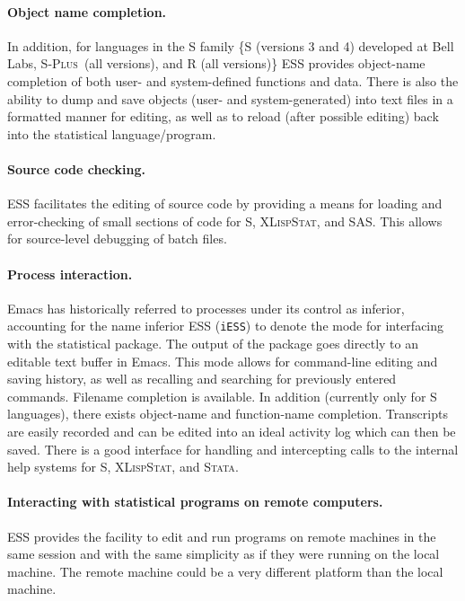 \documentclass{article}
\newcommand*{\Splus}{\textsc{S-Plus}}
\newcommand*{\XLispStat}{\textsc{XLispStat}}
\newcommand*{\Stata}{\textsc{Stata}}
\newcommand{\stexttt}[1]{{\small\texttt{#1}}}
\begin{document}
\paragraph{Object name completion.}
In addition, for languages in the S family \{S (versions 3 and 4)
developed at Bell Labs, \Splus\ (all versions), and R (all versions)\}
ESS provides object-name completion of both user- and system-defined
functions and data.  There is also the ability to dump and save
objects (user- and system-generated) into text files in a formatted
manner for editing, as well as to reload (after possible editing) back
into the statistical language/program.

\paragraph{Source code checking.}
ESS facilitates the editing of source code by providing a means for
loading and error-checking of small sections of code for S,
\XLispStat, and SAS.  This allows for source-level debugging of batch
files.

\paragraph{Process interaction.}
Emacs has historically referred to processes under its control as
inferior, accounting for the name inferior ESS (\stexttt{iESS}) to
denote the mode for interfacing with the statistical package.  The
output of the package goes directly to an editable text buffer in
Emacs.  This mode allows for command-line editing and saving history,
as well as recalling and searching for previously entered commands.
Filename completion is available.  In addition (currently only for
S languages), there exists object-name and function-name completion.
Transcripts are easily recorded and can be edited into an ideal
activity log which can then be saved.  There is a good interface for
handling and intercepting calls to the internal help systems for S,
\XLispStat, and \Stata.

\paragraph{Interacting with statistical programs on remote computers.}
ESS provides the facility to edit and run programs on remote machines
in the same session and with the same simplicity as if they were
running on the local machine.  The remote machine could be a very
different platform than the local machine.
\end{document}
